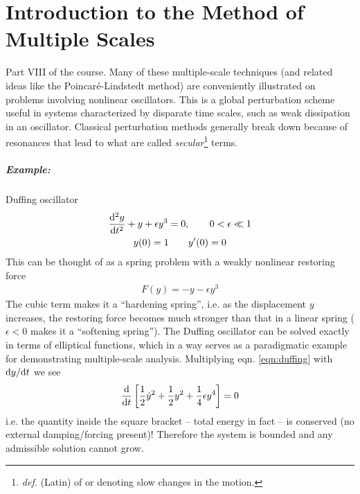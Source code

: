 \chapter[Multiple scales]{Introduction to the Method of Multiple Scales}

Part VIII of the course. Many of these multiple-scale techniques (and related ideas like the Poincar\'e-Lindstedt method) are conveniently illustrated on problems involving nonlinear oscillators. This is a global perturbation scheme useful in systems characterized by disparate time scales, such as weak dissipation in an oscillator. Classical perturbation methods generally break down because of resonances that lead to what are called \emph{secular}\footnote{\emph{def.} (Latin) of or denoting slow changes in the motion.} terms.

\paragraph{Example:} Duffing oscillator
\begin{gather}\label{eqn:duffing}
\frac{\mathrm{d}^2 y}{\mathrm{d} t^2} + y + \epsilon y^3 = 0, \qquad 0 < \epsilon \ll 1 \\
y(0) = 1 \qquad y'(0) = 0 \nonumber 
\end{gather}
This can be thought of as a spring problem with a weakly nonlinear restoring force 
\begin{gather*}
	F(y) = -y - \epsilon y^3
\end{gather*}
The cubic term makes it a ``hardening spring'', i.e. as the displacement $y$ increases, the restoring force becomes much stronger than that in a linear spring ($\epsilon<0$ makes it a ``softening spring''). The Duffing oscillator can be solved exactly in terms of elliptical functions, which in a way serves as a paradigmatic example for demonstrating multiple-scale analysis. Multiplying eqn. \ref{eqn:duffing} with $\mathrm{d} y/\mathrm{d} t$ we see
\begin{gather}
\frac{\mathrm{d}}{\mathrm{d} t} \left[ \frac{1}{2} \dot{y}^2 + \frac{1}{2}y^2 + \frac{1}{4} \epsilon y^4 \right] = 0 \label{eqn:wk22-duffing-energy}
\end{gather}
i.e. the quantity inside the square bracket -- total energy in fact -- is conserved (no external damping/forcing present)! Therefore the system is bounded and any admissible solution cannot grow.

